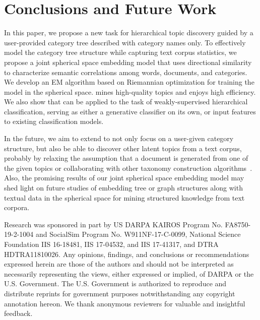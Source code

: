 \documentclass[sigconf]{acmart}
\theoremstyle{definition}
\begin{document}
 


\section{Conclusions and Future Work}
In this paper, we propose a new task for hierarchical topic discovery guided by a user-provided category tree described with category names only. To effectively model the category tree structure while capturing text corpus statistics, we propose a joint spherical space embedding model \josh that uses directional similarity to characterize semantic correlations among words, documents, and categories. We develop an EM algorithm based on Riemannian optimization for training the model in the spherical space. \josh mines high-quality topics and enjoys high efficiency. We also show that \josh can be applied to the task of weakly-supervised hierarchical classification, serving as either a generative classifier on its own, or input features to existing classification models.

In the future, we aim to extend \josh to not only focus on a user-given category structure, but also be able to discover other latent topics from a text corpus, probably by relaxing the assumption that a document is generated from one of the given topics or collaborating with other taxonomy construction algorithms~\cite{Huang2020CoRel,Huang2020GuidingCS}. Also, the promising results of our joint spherical space embedding model may shed light on future studies of embedding tree or graph structures along with textual data in the spherical space for mining structured knowledge from text corpora.
 

\begin{acks}
Research was sponsored in part by US DARPA KAIROS Program No. FA8750-19-2-1004 and SocialSim Program No.  W911NF-17-C-0099, National Science Foundation IIS 16-18481, IIS 17-04532, and IIS 17-41317, and DTRA HDTRA11810026. Any opinions, findings, and conclusions or recommendations expressed herein are those of the authors and should not be interpreted as necessarily representing the views, either expressed or implied, of DARPA or the U.S. Government. The U.S. Government is authorized to reproduce and distribute reprints for government purposes notwithstanding any copyright annotation hereon. 
We thank anonymous reviewers for valuable and insightful feedback.
\end{acks}





\balance

\end{document}
